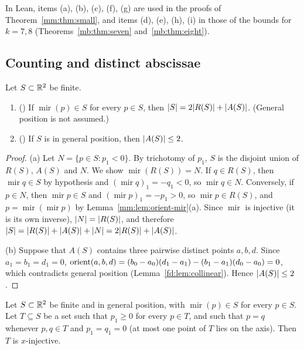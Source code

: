 In Lean, items (a), (b), (c), (f), (g) are used in the proofs of Theorem~\ref{mm:thm:small}, and items
(d), (e), (h), (i) in those of the bounds for $k=7,8$ (Theorems~\ref{mb:thm:seven}
and~\ref{mb:thm:eight}).

\subsection{Counting and distinct abscissae}

\begin{lemma}\label{mm:lem:count}
Let $S\subset\mathbb R^2$ be finite.
\begin{enumerate}[label=(\alph*)]
\item () If $\operatorname{mir}(p)\in S$ for every $p\in S$, then
  $\lvert S\rvert=2\lvert R(S)\rvert+\lvert A(S)\rvert$. (General position is not assumed.)
\item () If $S$ is in general position, then $\lvert A(S)\rvert\le2$.
\end{enumerate}
\end{lemma}

\begin{proof}
(a) Let $N=\{p\in S:p_1<0\}$. By trichotomy of $p_1$, $S$ is the disjoint union of $R(S)$, $A(S)$ and $N$.
We show $\operatorname{mir}(R(S))=N$. If $q\in R(S)$, then $\operatorname{mir}q\in S$ by hypothesis and
$(\operatorname{mir}q)_1=-q_1<0$, so $\operatorname{mir}q\in N$. Conversely, if $p\in N$, then
$\operatorname{mir}p\in S$ and $(\operatorname{mir}p)_1=-p_1>0$, so $\operatorname{mir}p\in R(S)$, and
$p=\operatorname{mir}(\operatorname{mir}p)$ by Lemma~\ref{mm:lem:orient-mir}(a). Since $\operatorname{mir}$
is injective (it is its own inverse), $\lvert N\rvert=\lvert R(S)\rvert$, and therefore
$\lvert S\rvert=\lvert R(S)\rvert+\lvert A(S)\rvert+\lvert N\rvert=2\lvert R(S)\rvert+\lvert A(S)\rvert$.

(b) Suppose that $A(S)$ contains three pairwise distinct points $a,b,d$. Since $a_1=b_1=d_1=0$,
$\operatorname{orient}(a,b,d)=(b_0-a_0)(d_1-a_1)-(b_1-a_1)(d_0-a_0)=0$, which contradicts general position
(Lemma~\ref{fd:lem:collinear}). Hence $\lvert A(S)\rvert\le2$.
\end{proof}

\begin{lemma}\label{mm:lem:injx}
Let $S\subset\mathbb R^2$ be finite and in general position, with $\operatorname{mir}(p)\in S$ for every $p\in S$.
Let $T\subseteq S$ be a set such that $p_1\ge0$ for every $p\in T$, and such that $p=q$ whenever $p,q\in T$
and $p_1=q_1=0$ (at most one point of $T$ lies on the axis). Then $T$ is $x$-injective.
\end{lemma}

